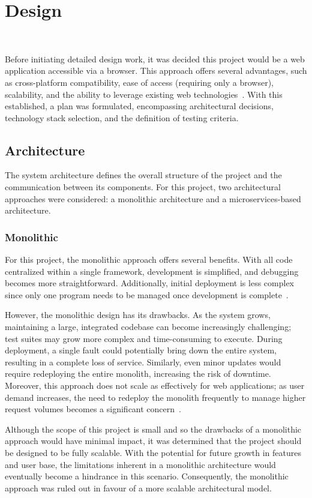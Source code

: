 \chapter{Design}~\label{cha:design}

Before initiating detailed design work, it was decided this project would be a web application accessible via a browser. This approach offers several advantages, such as cross-platform compatibility, ease of access (requiring only a browser), scalability, and the ability to leverage existing web technologies~\cite{6822300}. With this established, a plan was formulated, encompassing architectural decisions, technology stack selection, and the definition of testing criteria.

\section{Architecture}
The system architecture defines the overall structure of the project and the communication between its components. For this project, two architectural approaches were considered: a monolithic architecture and a microservices-based architecture.

\subsection{Monolithic}
For this project, the monolithic approach offers several benefits. With all code centralized within a single framework, development is simplified, and debugging becomes more straightforward. Additionally, initial deployment is less complex since only one program needs to be managed once development is complete~\cite{9109514}.

However, the monolithic design has its drawbacks. As the system grows, maintaining a large, integrated codebase can become increasingly challenging; test suites may grow more complex and time-consuming to execute. During deployment, a single fault could potentially bring down the entire system, resulting in a complete loss of service. Similarly, even minor updates would require redeploying the entire monolith, increasing the risk of downtime. Moreover, this approach does not scale as effectively for web applications; as user demand increases, the need to redeploy the monolith frequently to manage higher request volumes becomes a significant concern~\cite{9109514}.

Although the scope of this project is small and so the drawbacks of a monolithic approach would have minimal impact, it was determined that the project should be designed to be fully scalable. With the potential for future growth in features and user base, the limitations inherent in a monolithic architecture would eventually become a hindrance in this scenario. Consequently, the monolithic approach was ruled out in favour of a more scalable architectural model.

